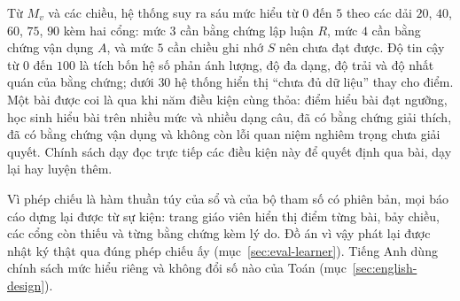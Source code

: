 Từ $M_v$ và các chiều, hệ thống suy ra sáu mức hiểu từ $0$ đến $5$ theo các dải $20$, $40$, $60$, $75$, $90$ kèm hai cổng: mức $3$ cần bằng chứng lập luận $R$, mức $4$ cần bằng chứng vận dụng $A$, và mức $5$ cần chiều ghi nhớ $S$ nên chưa đạt được. Độ tin cậy từ $0$ đến $100$ là tích bốn hệ số phản ánh lượng, độ đa dạng, độ trải và độ nhất quán của bằng chứng; dưới $30$ hệ thống hiển thị ``chưa đủ dữ liệu'' thay cho điểm. Một bài được coi là qua khi năm điều kiện cùng thỏa: điểm hiểu bài đạt ngưỡng, học sinh hiểu bài trên nhiều mức và nhiều dạng câu, đã có bằng chứng giải thích, đã có bằng chứng vận dụng và không còn lỗi quan niệm nghiêm trọng chưa giải quyết. Chính sách dạy đọc trực tiếp các điều kiện này để quyết định qua bài, dạy lại hay luyện thêm.

Vì phép chiếu là hàm thuần túy của sổ và của bộ tham số có phiên bản, mọi báo cáo dựng lại được từ sự kiện: trang giáo viên hiển thị điểm từng bài, bảy chiều, các cổng còn thiếu và từng bằng chứng kèm lý do. Đồ án vì vậy phát lại được nhật ký thật qua đúng phép chiếu ấy (mục~\ref{sec:eval-learner}). Tiếng Anh dùng chính sách mức hiểu riêng và không đổi số nào của Toán (mục~\ref{sec:english-design}).

